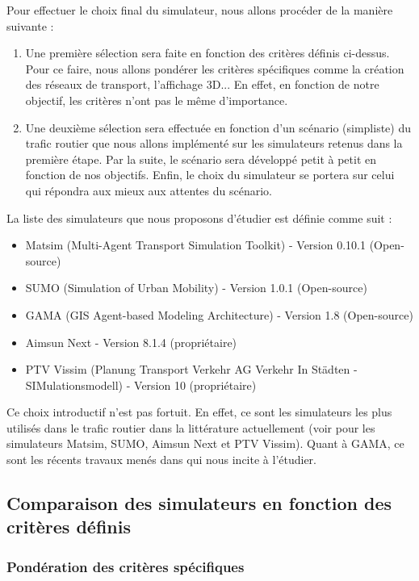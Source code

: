 
Pour effectuer le choix final du simulateur, nous allons procéder de la manière suivante :
\begin{enumerate}
    \item Une première sélection sera faite en fonction des critères définis ci-dessus. Pour ce faire, nous allons pondérer les critères spécifiques comme la création des réseaux de transport, l'affichage 3D... En effet, en fonction de notre objectif, les critères n'ont pas le même d'importance.
    \item Une deuxième sélection sera effectuée en fonction d'un scénario (simpliste) du trafic routier que nous allons implémenté sur les simulateurs retenus dans la première étape. Par la suite, le scénario sera développé petit à petit en fonction de nos objectifs. Enfin, le choix du simulateur se portera sur celui qui répondra aux mieux aux attentes du scénario.    
\end{enumerate}


La liste des simulateurs que nous proposons d'étudier est définie comme suit :
\begin{itemize}
    \item Matsim (Multi-Agent Transport Simulation Toolkit) - Version 0.10.1 (Open-source)
    \item SUMO (Simulation of Urban Mobility) - Version 1.0.1 (Open-source)
    \item GAMA (GIS Agent-based Modeling Architecture) - Version 1.8 (Open-source) 
    \item Aimsun Next - Version 8.1.4 (propriétaire)
    \item PTV Vissim (Planung Transport Verkehr AG Verkehr In Städten - SIMulationsmodell) - Version 10 (propriétaire)
\end{itemize}

Ce choix introductif n'est pas fortuit. En effet, ce sont les simulateurs les plus utilisés dans le trafic routier dans la littérature actuellement (voir \cite{ejercito2017traffic} pour les simulateurs Matsim, SUMO, Aimsun Next et PTV Vissim). Quant à GAMA, ce sont les récents travaux menés dans \cite{grignard2018impact} qui nous incite à l'étudier.

\subsection{Comparaison des simulateurs en fonction des critères définis}

\subsubsection{Pondération des critères spécifiques}

